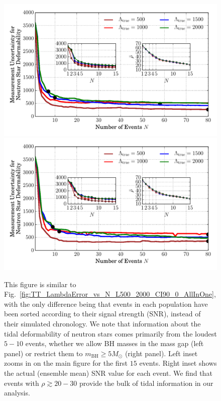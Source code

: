 \documentclass[aps,prd,amsmath,floats,floatfix, twocolumn,
superscriptaddress,nofootinbib,showpacs]{revtex4-1}
\newcommand{\mbh}{m_\mathrm{BH}}
\begin{document}
% 
\begin{figure}
\centering    
\includegraphics[width=1.025\columnwidth,trim=1cm 0 0 0]{LambdaMedianCIWidths90pc_vs_N_AllPopulation_SNRSorted}
\includegraphics[width=1.025\columnwidth,trim=0 0 1cm 0]{LambdaCIWidths90pc_vs_N_AstroPopulation_SNRSorted}
\caption{This figure is similar to Fig.~\ref{fig:TT_LambdaError_vs_N_L500_2000_CI90_0_AllInOne},
with the only difference being that events in each population
have been sorted according to their signal strength (SNR), instead of
their simulated chronology. We note that information about
the tidal deformability of neutron stars comes primarily 
from the loudest $5-10$ events, whether we allow BH masses
in the mass gap (left panel) or restrict them to
$\mbh\geq 5M_\odot$ (right panel). Left inset zooms
in on the main figure for the first $15$ events. Right inset
shows the actual (ensemble mean) SNR value for each event. We find that
events with $\rho\gtrsim 20-30$ provide the bulk of tidal information
in our analysis.
}
\label{fig:TT_LambdaError_vs_N_L500_2000_CI90_0_AllInOne_SNRSorted}
\end{figure}
% 
\end{document}
